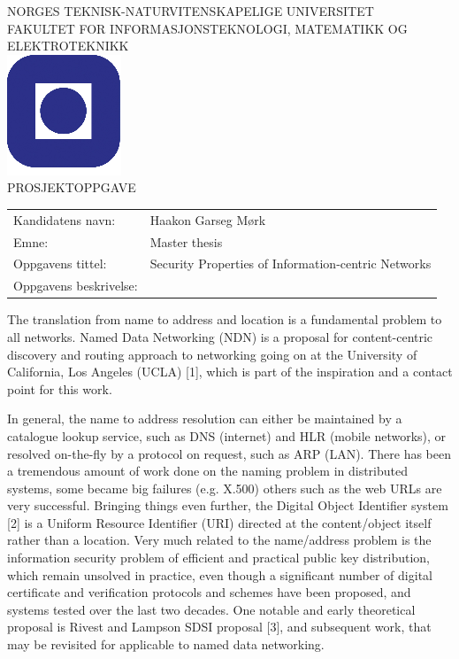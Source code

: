 \documentclass[a4paper,11pt]{article}
\begin{document}
\sffamily
\begin{titlepage}
\begin{center}
\textsc{NORGES TEKNISK-NATURVITENSKAPELIGE UNIVERSITET\\
FAKULTET FOR INFORMASJONSTEKNOLOGI, MATEMATIKK OG ELEKTROTEKNIKK} \\
\vspace{0.5cm} 
\includegraphics[scale=0.5]{NTNU-logo} \\
\vspace{1.0cm}
{\Huge{PROSJEKTOPPGAVE}}
\vspace{1.0cm}
\end{center}

\begin{tabular}{@{}p{5cm}l}
Kandidatens navn:	& Haakon Garseg Mørk\\
Emne:			& Master thesis\\
Oppgavens tittel: 	& Security Properties of Information-centric Networks \\
Oppgavens beskrivelse: 	& \\
\end{tabular}

The translation from name to address and location is a fundamental problem to all networks.
Named Data Networking (NDN) is a proposal for content-centric discovery and routing approach to networking
going on at the University of California, Los Angeles (UCLA) [1], which is part of the inspiration and a contact point for this work.

In general, the name to address resolution can either be maintained by a catalogue lookup service, 
such as DNS (internet) and HLR (mobile networks), or resolved on-the-fly by a protocol on request, such as ARP (LAN). 
There has been a tremendous amount of work done on the naming problem in distributed systems, 
some became big failures (e.g. X.500) others such as the web URLs are very successful. Bringing things even further,
the Digital Object Identifier system [2] is a Uniform Resource Identifier (URI) directed at the content/object itself rather than a location. 
Very much related to the name/address problem is the information security problem of efficient and practical public key distribution, 
which remain unsolved in practice, 
even though a significant number of digital certificate and verification protocols and schemes have been proposed,
and systems tested over the last two decades. 
One notable and early theoretical proposal is Rivest and Lampson SDSI proposal [3],
and subsequent work, that may be revisited for applicable to named data networking.


\end{titlepage}
\end{document}
